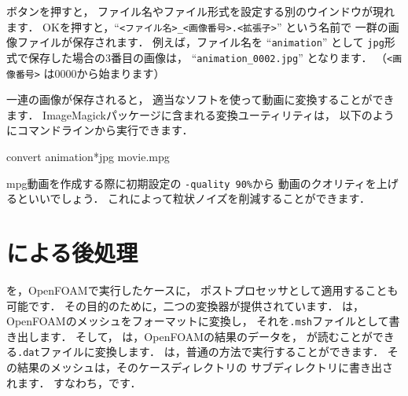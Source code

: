 ボタンを押すと，
ファイル名やファイル形式を設定する別のウインドウが現れます．
OKを押すと，``\verb|<ファイル名>_<画像番号>.<拡張子>|'' という名前で
一群の画像ファイルが保存されます．
例えば，ファイル名を ``\verb|animation|'' として
\texttt{jpg}形式で保存した場合の3番目の画像は，
``\verb|animation_0002.jpg|'' となります．
（\verb|<画像番号>| は0000から始まります）

一連の画像が保存されると，
適当なソフトを使って動画に変換することができます．
ImageMagickパッケージに含まれる変換ユーティリティは，
以下のようにコマンドラインから実行できます．
\begin{OFverbatim}[terminal]
convert animation*jpg movie.mpg
\end{OFverbatim}
mpg動画を作成する際に初期設定の \verb|-quality 90%|から
動画のクオリティを上げるといいでしょう．
これによって粒状ノイズを削減することができます．



\section{による後処理}
\label{sec:6.2}
を，OpenFOAMで実行したケースに，
ポストプロセッサとして適用することも可能です．
その目的のために，二つの変換器が提供されています．
%
%
は，
OpenFOAMのメッシュをフォーマットに変換し，
それを\texttt{.msh}ファイルとして書き出します．
そして，
%
%
は，OpenFOAMの結果のデータを，
が読むことができる\texttt{.dat}ファイルに変換します．
は，普通の方法で実行することができます．
その結果のメッシュは，そのケースディレクトリの
%
%
サブディレクトリに書き出されます．
すなわち，です．

